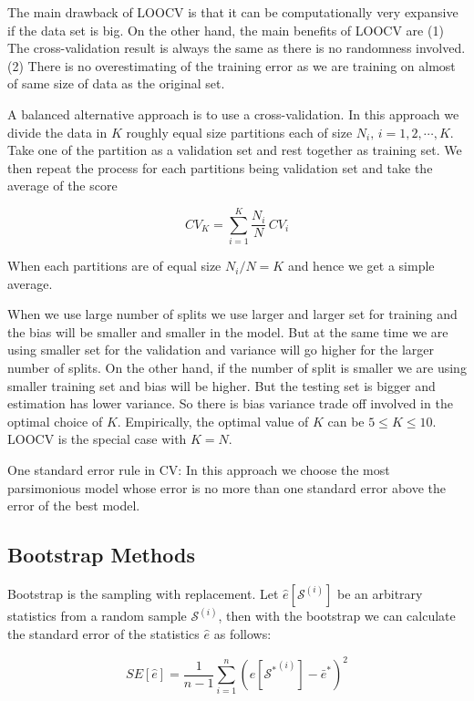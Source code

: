\documentclass[11pt]{article}
\theoremstyle{definition}
\begin{document}
The main drawback of LOOCV is that it can be computationally very expansive if the data set is big.  On the other hand, the main benefits of LOOCV are (1) The cross-validation result is always the same as there is no randomness involved. (2) There is no overestimating of the training error as we are training on almost of same size of data as the original set. 

A balanced alternative approach is to use a cross-validation. In this approach we divide the data in $K$ roughly equal size partitions each of size $N_i, \, i = 1, 2, \cdots, K$. Take one of the partition as a validation set and rest together as training set. We then repeat the process for each partitions being validation set and take the average of the score 

$$
CV_K = \sum_{i=1}^K \frac{N_i}{N}\,  CV_i
$$

When each partitions are of equal size $N_i/N=K$ and hence we get a simple average. 



When we use large number of splits we use larger and larger set for training and the bias will be smaller and smaller in the model. But at the same time we are using smaller set for the validation and variance will go higher for the larger number of splits. On the other hand, if the number of split is smaller we are using smaller training set and bias will be higher. But the testing set is bigger and estimation has lower variance. So there is bias variance trade off involved in the optimal choice of $K$. Empirically, the optimal value of $K$ can be $5\leqslant K \leqslant 10$. LOOCV is the special case with $K=N$. 

One standard error rule in CV: In this approach we choose the most parsimonious model whose error is no more than one standard error above the error of the best model. 





\subsection{Bootstrap Methods }



Bootstrap is the sampling with replacement. Let $\hat{e}[\mathcal{S}^{(i)}]$ be an arbitrary statistics from a random sample $\mathcal{S}^{(i)}$, then with the bootstrap we can calculate the standard error of the statistics $\hat{e}$ as follows:

$$
SE[\hat{e}] = \frac{1}{n-1} \sum_{i=1}^n (\hat{e}[\mathcal{S^*}^{(i)}] - \bar{e}^*)^2
$$
\end{document}
